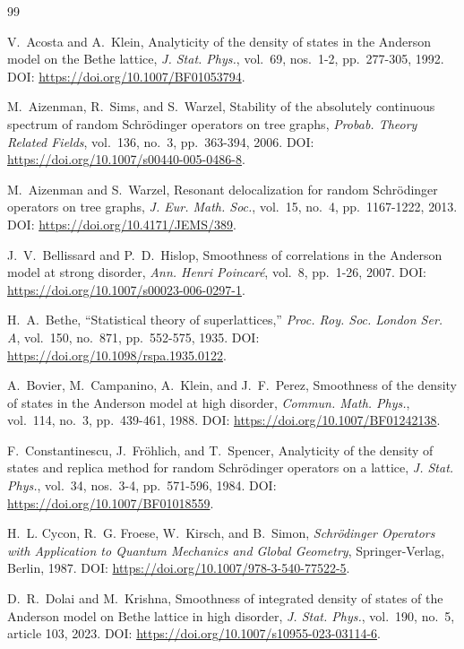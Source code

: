 \documentclass[a4paper,11pt]{article}
\begin{document}

\begin{thebibliography}{99}

V.~Acosta and A.~Klein,
Analyticity of the density of states in the Anderson model on the Bethe lattice,
\textit{J. Stat. Phys.},
vol.~69, nos.~1-2, pp.~277-305, 1992.
DOI: \url{https://doi.org/10.1007/BF01053794}.

M.~Aizenman, R.~Sims, and S.~Warzel,
Stability of the absolutely continuous spectrum of random Schr\"odinger operators on tree graphs,
\textit{Probab. Theory Related Fields},
vol.~136, no.~3, pp.~363-394, 2006.
DOI: \url{https://doi.org/10.1007/s00440-005-0486-8}.

M.~Aizenman and S.~Warzel,
Resonant delocalization for random Schr\"odinger operators on tree graphs,
\textit{J. Eur. Math. Soc.},
vol.~15, no.~4, pp.~1167-1222, 2013.
DOI: \url{https://doi.org/10.4171/JEMS/389}.

J.~V.~Bellissard and P.~D.~Hislop,
Smoothness of correlations in the Anderson model at strong disorder,
\textit{Ann. Henri Poincar\'e},
vol.~8, pp.~1-26, 2007.
DOI: \url{https://doi.org/10.1007/s00023-006-0297-1}.

H.~A.~Bethe,
``Statistical theory of superlattices,''
\textit{Proc. Roy. Soc. London Ser. A},
vol.~150, no.~871, pp.~552-575, 1935.
DOI: \url{https://doi.org/10.1098/rspa.1935.0122}.

A.~Bovier, M.~Campanino, A.~Klein, and J.~F.~Perez,
Smoothness of the density of states in the Anderson model at high disorder,
\textit{Commun. Math. Phys.},
vol.~114, no.~3, pp.~439-461, 1988.
DOI: \url{https://doi.org/10.1007/BF01242138}.

F.~Constantinescu, J.~Fr\"ohlich, and T.~Spencer,
Analyticity of the density of states and replica method for random Schr\"odinger operators on a lattice,
\textit{J. Stat. Phys.},
vol.~34, nos.~3-4, pp.~571-596, 1984.
DOI: \url{https://doi.org/10.1007/BF01018559}.

H.~L. Cycon, R.~G. Froese, W.~Kirsch, and B.~Simon,
\textit{Schr\"odinger Operators with Application to Quantum Mechanics and Global Geometry},
Springer-Verlag, Berlin, 1987.
DOI: \url{https://doi.org/10.1007/978-3-540-77522-5}.

D.~R.~Dolai and M.~Krishna,
Smoothness of integrated density of states of the Anderson model on Bethe lattice in high disorder,
\textit{J. Stat. Phys.},
vol.~190, no.~5, article 103, 2023.
DOI: \url{https://doi.org/10.1007/s10955-023-03114-6}.


\end{thebibliography}
\end{document}
